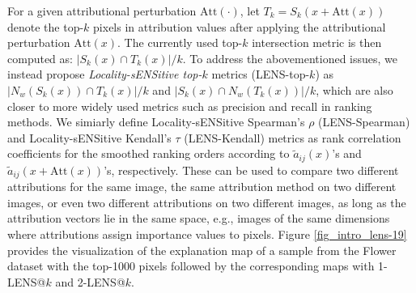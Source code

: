 \documentclass[letterpaper]{article} %
\newcommand{\size}[1]{\left|#1\right|}
\begin{document}
For a given attributional perturbation $\mathrm{Att}(\cdot)$, let $T_{k} = S_{k}(x + \mathrm{Att}(x))$ denote the top-$k$ pixels in attribution values after applying the attributional perturbation $\mathrm{Att}(x)$. The currently used top-$k$ intersection metric is then computed as: $\size{S_{k}(x) \cap T_{k}(x)}/k$. To address the abovementioned issues, we instead propose \emph{Locality-sENSitive top-$k$} metrics (LENS-top-$k$) as $\size{N_{w}(S_{k}(x)) \cap T_{k}(x)}/k$ and $\size{S_{k}(x) \cap N_{w}(T_{k}(x))}/k$, which are also closer to more widely used metrics such as precision and recall in ranking methods. We simiarly define Locality-sENSitive Spearman's $\rho$ (LENS-Spearman) and Locality-sENSitive Kendall's $\tau$ (LENS-Kendall) metrics as rank correlation coefficients for the smoothed ranking orders according to $\tilde{a}_{ij}(x)$'s and $\tilde{a}_{ij}(x + \mathrm{Att}(x))$'s, respectively. These can be used to compare two different attributions for the same image, the same attribution method on two different images, or even two different attributions on two different images, as long as the attribution vectors lie in the same space, e.g., images of the same dimensions where attributions assign importance values to pixels. Figure \ref{fig_intro_lens-19} provides the visualization of the explanation map of a sample from the Flower dataset with the top-1000 pixels followed by the corresponding maps with 1-LENS@$k$ and 2-LENS@$k$.
\end{document}
